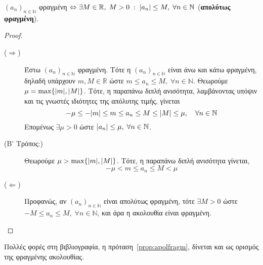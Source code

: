 \begin{mybox3}
  \begin{prop}\label{prop:apolfragm}
    {$ (a_{n})_{n \in \mathbb{N}} $ φραγμένη $ \Leftrightarrow \exists M \in 
      \mathbb{R}, \; M>0 \; : \; \abs{a_{n}} \leq M, \; \forall n \in \mathbb{N} $ 
    (\textbf{απολύτως φραγμένη}).}
  \end{prop}
\end{mybox3}
\begin{proof}
\item {}
  \begin{description}
    \item [($ \Rightarrow $)] Έστω $ (a_{n})_{n \in \mathbb{N}} $ φραγμένη. Τότε η 
      $ (a_{n})_{n \in \mathbb{N}} $ είναι άνω και κάτω φραγμένη, δηλαδή υπάρχουν 
      $ m,M \in \mathbb{R} $ ώστε $ m \leq a_{n} \leq M, \; \forall n \in \mathbb{N} $.
      Θεωρούμε $ \mu = \max \{ \abs{m} , \abs{M} \} $. Τότε, η παραπάνω διπλή 
      ανισότητα, λαμβάνοντας υπόψιν και τις γνωστές ιδιότητες της απόλυτης τιμής, 
      γίνεται
      \[
        - \mu \leq - \abs{m} \leq m \leq a_{n} \leq M \leq \abs{M} \leq \mu , 
        \quad \forall n \in \mathbb{N}
      \]
      Επομένως $ \exists \mu > 0 $ ώστε 
      $ \abs{a_{n}} \leq \mu, \; \forall n \in \mathbb{N} $.

    \item[(Β' Τρόπος:)]
      Θεωρούμε $ \mu > \max \{ \abs{m} , \abs{M} \} $. Τότε, η παραπάνω διπλή 
      ανισότητα γίνεται,
      \[
        - \mu < m \leq a_{n} \leq M < \mu  
      \] 

    \item [($ \Leftarrow$)] Προφανώς, αν $( a_{n})_{n \in \mathbb{N}} $ είναι 
      απολύτως φραγμένη, τότε $ \exists M>0 $ ώστε $ -M \leq a_{n} \leq M, \; \forall n
      \in \mathbb{N} $, και άρα η ακολουθία είναι φραγμένη. 
  \end{description}
\end{proof}

\begin{rem}
  Πολλές φορές στη βιβλιογραφία, η πρόταση~\ref{prop:apolfragm}, 
  δίνεται και ως ορισμός της φραγμένης ακολουθίας.
\end{rem}

